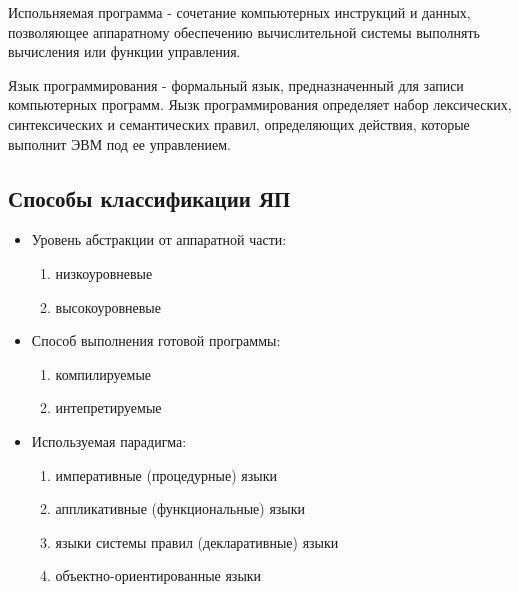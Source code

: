 \begin{definition}
  Испольняемая программа - сочетание компьютерных инструкций и данных, позволяющее аппаратному обеспечению вычислительной системы выполнять вычисления или функции управления.
\end{definition}

\begin{definition}
  Язык программирования - формальный язык, предназначенный для записи компьютерных программ. Яызк программирования определяет набор лексических, синтексических и семантических правил, определяющих действия, которые выполнит ЭВМ под ее управлением.
\end{definition}

\subsection{Способы классификации ЯП}
\begin{itemize}
  \item Уровень абстракции от аппаратной части:
    \begin{enumerate}
      \item низкоуровневые
      \item высокоуровневые
    \end{enumerate}
  \item Способ выполнения готовой программы:
    \begin{enumerate}
      \item компилируемые
      \item интепретируемые
    \end{enumerate}
  \item Используемая парадигма:
    \begin{enumerate}
      \item императивные (процедурные) языки
      \item аппликативные (функциональные) языки
      \item языки системы правил (декларативные) языки
      \item объектно-ориентированные языки
    \end{enumerate}
\end{itemize}

